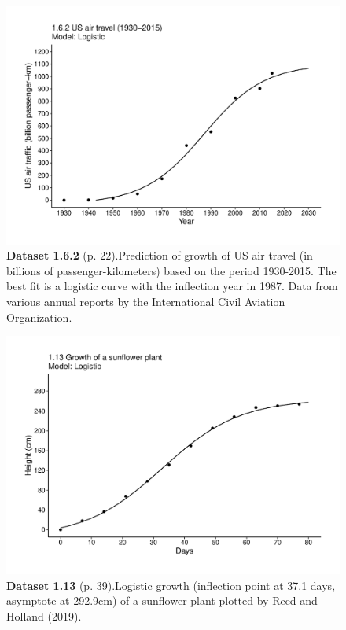 \documentclass[aps,rmp,preprint,superscriptaddress,10pt,onecolumn]{article}
\begin{document}
\clearpage
\begin{figure}[h]
\includegraphics[width=\textwidth]{output/figs-ggplot/1.6.2.pdf}
\caption*{\textbf{Dataset 1.6.2} (p. 22).Prediction of growth of US air travel (in billions of passenger-kilometers) based on the period 1930-2015. The best fit is a logistic curve with the inflection year in 1987. Data from various annual reports by the International Civil Aviation Organization. }
\end{figure}
	
\clearpage
\begin{figure}[h]
\includegraphics[width=\textwidth]{output/figs-ggplot/1.13.pdf}
\caption*{\textbf{Dataset 1.13} (p. 39).Logistic growth (inflection point at 37.1 days, asymptote at 292.9cm) of a sunflower plant plotted by Reed and Holland (2019). }
\end{figure}
	
\end{document}
